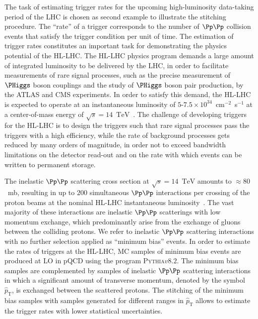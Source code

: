 \documentclass[twocolumn,epjc3]{svjour3}
\newcommand{\pThat}{\ensuremath{\hat{p}_{\textrm{T}}}\xspace}
\newcommand{\TeV}{\ensuremath{\textrm{TeV}}\xspace}
\newcommand{\PYTHIA}{\textsc{Pythia}\xspace}
\begin{document}
The task of estimating trigger rates for the upcoming high-luminosity data-taking period of the LHC is chosen as second example to illustrate the stitching procedure.
The ``rate'' of a trigger corresponds to the number of $\Pp\Pp$ collision events that satisfy the trigger condition per unit of time.
The estimation of trigger rates constitutes an important task for demonstrating the physics potential of the HL-LHC.
The HL-LHC physics program demands a large amount of integrated luminosity to be delivered by the LHC, 
in order to facilitate measurements of rare signal processes,
such as the precise measurement of $\PHiggs$ boson couplings and the study of $\PHiggs$ boson pair production, by the ATLAS and CMS experiments.
In order to satisfy this demand, the HL-LHC is expected to operate at an instantaneous luminosity of $5$-$7.5 \times 10^{34}$~cm$^{-2}$~s$^{-1}$
at a center-of-mass energy of $\sqrt{s} = 14$~\TeV~\cite{TDR_Phase2_LHC}.
The challenge of developing triggers for the HL-LHC is to design the triggers such that rare signal processes pass the triggers with a high efficiency,
while the rate of background processes gets reduced by many orders of magnitude, in order not to exceed bandwidth limitations on the detector read-out 
and on the rate with which events can be written to permanent storage.

The inelastic $\Pp\Pp$ scattering cross section at $\sqrt{s} = 14$~\TeV amounts to $\approx 80$~mb,
resulting in up to $200$ simultaneous $\Pp\Pp$ interactions per crossing of the proton beams at the nominal HL-LHC instantaneous luminosity~\cite{TDR_Phase2_LHC}.
The vast majority of these interactions are inelastic $\Pp\Pp$ scatterings with low momentum exchange,
which predominantly arise from the exchange of gluons between the colliding protons.
We refer to inelastic $\Pp\Pp$ scattering interactions with no further selection applied as ``minimum bias'' events.
In order to estimate the rates of triggers at the HL-LHC,
MC samples of minimum bias events are produced at LO in pQCD using the program \PYTHIA $v8.2$.
The minimum bias samples are complemented by samples of inelastic $\Pp\Pp$ scattering interactions
in which a significant amount of transverse momentum, denoted by the symbol $\pThat$, is exchanged between the scattered protons.
The stitching of the minimum bias samples with samples generated for different ranges in $\pThat$ allows to estimate the trigger rates with lower statistical uncertainties.
\end{document}
